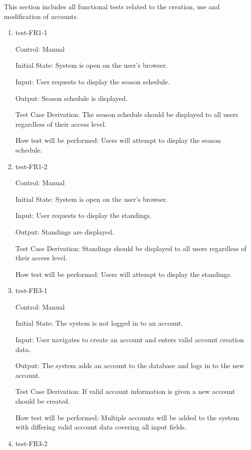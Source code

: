\documentclass[12pt, titlepage]{article}
\begin{document}
This section includes all functional tests related to the creation, use and
modification of accounts.

\begin{enumerate}

  \item{test-FR1-1\\}

  Control: Manual

  Initial State: System is open on the user's browser.

  Input: User requests to display the season schedule.

  Output: Season schedule is displayed.

  Test Case Derivation: The season schedule should be displayed to all users
  regardless of their access level.

  How test will be performed: Users will attempt to display
  the season schedule.

  \item{test-FR1-2\\}

  Control: Manual

  Initial State: System is open on the user's browser.

  Input: User requests to display the standings.

  Output: Standings are displayed.

  Test Case Derivation: Standings should be displayed to all users
  regardless of their access level.

  How test will be performed: Users will attempt to display
  the standings.

  \item{test-FR3-1\\}

  Control: Manual

  Initial State: The system is not logged in to an account.

  Input: User navigates to create an account and enters valid account creation
  data.

  Output: The system adds an account to the database and logs in to the new
  account.

  Test Case Derivation: If valid account information is given a new account
  should be created.

  How test will be performed: Multiple accounts will be added to the system
  with differing valid account data covering all input fields.

  \item{test-FR3-2\\}


\end{enumerate}
\end{document}
